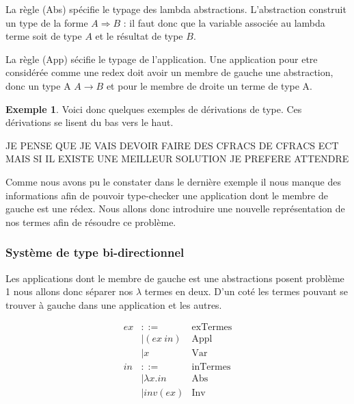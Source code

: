 \documentclass {article}
\theoremstyle{definition}
\newtheorem{example}{Exemple}
\theoremstyle{remark}
\begin{document}
La règle (Abs) spécifie le typage des lambda
abstractions. L'abstraction construit un type de la forme \(A
\Rightarrow B\) : il faut donc que la variable associée au lambda
terme soit de type \(A\) et le résultat de type \(B\).

La règle (App) sécifie le typage de l'application. Une application pour etre 
considérée comme une redex doit avoir un membre de gauche une abstraction, 
donc un type A \(A\rightarrow B\) et pour le membre de droite un terme 
de type A. 

\begin{example}
  Voici donc quelques exemples de dérivations de type.
  Ces dérivations se lisent du bas vers le haut.
  
  
  JE PENSE QUE JE VAIS DEVOIR FAIRE DES CFRACS DE CFRACS ECT MAIS SI
  IL EXISTE UNE MEILLEUR SOLUTION JE PREFERE ATTENDRE
\end{example}

Comme nous avons pu le constater dans le dernière exemple il nous manque des informations
afin de pouvoir type-checker une application dont le membre de gauche est une rédex.
Nous allons donc introduire une nouvelle représentation de nos termes afin de résoudre ce 
problème.

\subsubsection{Système de type bi-directionnel}

Les applications dont le membre de gauche est une abstractions posent problème 1
nous allons donc séparer nos \(\lambda\) termes en deux.
D'un coté les termes pouvant se trouver à gauche dans une application et les autres.

\begin{align*}
  ex &::= & \mbox{exTermes} \\
  &| (ex\: in) &\mbox{Appl}\\
  &| x &\mbox{Var} \\
  in &::= & \mbox{inTermes}\\
  &|\lambda x.in &\mbox{Abs}\\
  &|inv(ex) &\mbox{Inv}\\
\end{align*}
\end{document}
